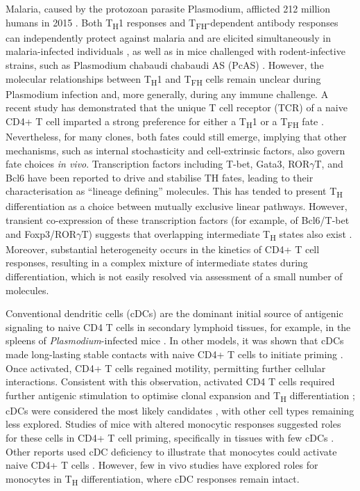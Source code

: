 Malaria, caused by the protozoan parasite Plasmodium, afflicted 212 million humans in 2015 \cite{Organization2016-tj}. Both T\textsubscript{H}1 responses \cite{Pinzon-Charry2010-zk} and T\textsubscript{FH}-dependent antibody responses \cite{Boyle2015-yg} can independently protect against malaria and are elicited simultaneously in malaria-infected individuals \cite{Obeng-Adjei2015-dc}, as well as in mice challenged with rodent-infective strains, such as Plasmodium chabaudi chabaudi AS (PcAS) \cite{Perez-Mazliah2014-cq}. However, the molecular relationships between T\textsubscript{H}1 and T\textsubscript{FH} cells remain unclear during Plasmodium infection and, more generally, during any immune challenge. A recent study has demonstrated that the unique T cell receptor (TCR) of a naive CD4+ T cell imparted a strong preference for either a T\textsubscript{H}1 or a T\textsubscript{FH} fate \cite{Tubo2013-zg}. Nevertheless, for many clones, both fates could still emerge, implying that other mechanisms, such as internal stochasticity and cell-extrinsic factors, also govern fate choices \textit{in vivo}. Transcription factors including T-bet, Gata3, ROR\( \gamma \)T, and Bcl6 have been reported to drive and stabilise TH fates, leading to their characterisation as “lineage defining” molecules. This has tended to present T\textsubscript{H} differentiation as a choice between mutually exclusive linear pathways. However, transient co-expression of these transcription factors (for example, of Bcl6/T-bet and Foxp3/ROR\( \gamma \)T) suggests that overlapping intermediate T\textsubscript{H} states also exist . Moreover, substantial heterogeneity occurs in the kinetics of CD4+ T cell responses, resulting in a complex mixture of intermediate states during differentiation, which is not easily resolved via assessment of a small number of molecules.

Conventional dendritic cells (cDCs) are the dominant initial source of antigenic signaling to naive CD4 T cells in secondary lymphoid tissues, for example, in the spleens of \textit{Plasmodium}-infected mice \cite{DeWalick2007-mu}. In other models, it was shown that cDCs made long-lasting stable contacts with naive CD4+ T cells to initiate priming \cite{Celli2007-dp}. Once activated, CD4+ T cells regained motility, permitting further cellular interactions. Consistent with this observation, activated CD4 T cells required further antigenic stimulation to optimise clonal expansion and T\textsubscript{H} differentiation \cite{Bajenoff2002-om}; cDCs were considered the most likely candidates \cite{Celli2007-dp, Groom2012-az}, with other cell types remaining less explored. Studies of mice with altered monocytic responses suggested roles for these cells in CD4+ T cell priming, specifically in tissues with few cDCs \cite{Hohl2009-wg}. Other reports used cDC deficiency to illustrate that monocytes could activate naive CD4+ T cells \cite{Nakano2009-rg}. However, few in vivo studies have explored roles for monocytes in T\textsubscript{H} differentiation, where cDC responses remain intact.

